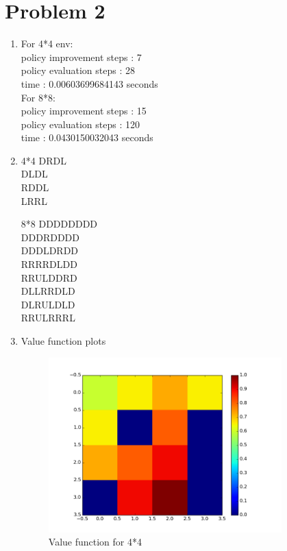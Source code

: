 \documentclass{article}
\begin{document}
\section{Problem 2}
\begin{enumerate}[label=(\alph*)]
\item 
For 4*4 env:\\
policy improvement steps : 7 \\
policy evaluation steps : 28 \\ 
time : 0.00603699684143 seconds\\

For 8*8:\\
policy improvement steps : 15\\
policy evaluation steps : 120 \\
time : 0.0430150032043 seconds
\item
4*4
DRDL\\
DLDL\\
RDDL\\
LRRL

8*8
DDDDDDDD\\
DDDRDDDD\\
DDDLDRDD\\
RRRRDLDD\\
RRULDDRD\\
DLLRRDLD\\
DLRULDLD\\
RRULRRRL

\item
Value function plots \\
\begin{figure}[H]
\centering
\includegraphics[width=90mm]{4_4.png}
\caption{Value function for 4*4 \label{overflow}}
\end{figure}


\end{enumerate}
\end{document}

